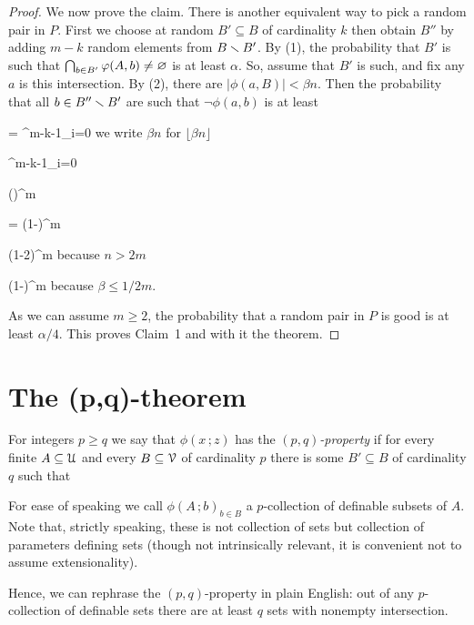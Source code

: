 \documentclass[scombinatorics.tex]{subfiles}
\begin{document}
\begin{proof}
We now prove the claim.
There is another equivalent way to pick a random pair in $P$.
First we choose at random $B'\subseteq B$ of cardinality $k$ then obtain $B''$ by adding $m-k$ random elements from $B\smallsetminus B'$.
By (1), the probability that $B'$ is such that $\bigcap_{b\in B'}\varphi(A,b)\neq\varnothing$ is at least $\alpha$.
So, assume that $B'$ is such, and fix any $a$ is this intersection.
By (2), there are $|\phi(a,B)|<\beta n$.
Then the probability that all $b\in B''\smallsetminus B'$ are such that $\neg\phi(a,b)$ is at least\smallskip

{=}
{\prod^{m-k-1}_{i=0}}
\hfill we write $\beta n$ for $\lfloor \beta n \rfloor$

\ceq{}
{\ge}
{\prod^{m-k-1}_{i=0}}

\ceq{}
{\ge}
{\bigg(\bigg)^m}

\ceq{}
{=}
{\bigg(1-\bigg)^m}

\ceq{}
{\ge}
{\displaystyle(1-2\beta)^m\vphantom{\bigg)}}
\hfill because $n>2m$

\ceq{}
{\ge}
{\bigg(1-\bigg)^m}
\hfill because $\beta\le1/2m.$

As we can assume $m\ge 2$, the probability that a random pair in $P$ is good is at least $\alpha/4$.
This proves Claim~1 and with it the theorem.
\end{proof}


\section{The (p,q)-theorem}

For integers $p\ge q$ we say that $\phi(x\,;z)$ has the \emph{$(p,q)$-property\/} if for every finite $A\subseteq\EuScript U$ and every $B\subseteq\EuScript V$ of cardinality $p$ there is some $B'\subseteq B$ of cardinality $q$ such that

{\neq}
{\0}

For ease of speaking we call $\phi(A\,;b)_{b\in B}$ a $p$-collection of definable subsets of $A$.
Note that, strictly speaking, these is not collection of sets but collection of parameters defining sets (though not intrinsically relevant, it is convenient not to assume extensionality). 

Hence, we can rephrase the $(p,q)$-property in plain English: out of any $p$-collection of definable sets there are at least $q$ sets with nonempty intersection.
\end{document}
